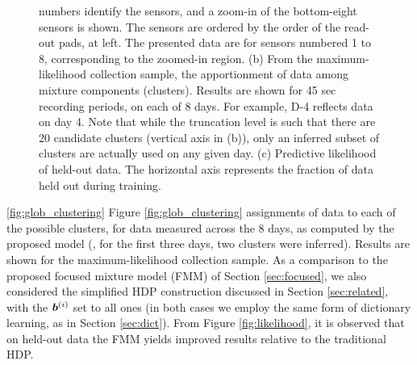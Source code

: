 \documentclass[journal]{IEEEtran}
\begin{document}
\begin{figure}[!htbp]
{{numbers identify the sensors, and a zoom-in of the bottom-eight
sensors is shown. The sensors are ordered by the order of the
read-out pads, at left. The presented data are for sensors numbered 1 to 8, corresponding to the zoomed-in region. (b) From the maximum-likelihood collection
sample, the apportionment of data among mixture components
(clusters). Results are shown for 45 sec recording periods, on each
of 8 days. For example, D-4 reflects data on day 4. Note that while the truncation level is such that there are 20 candidate clusters (vertical axis in (b)), only an inferred subset of clusters are actually used on any given day. (c) Predictive likelihood of held-out data. The
horizontal axis represents the fraction of data held out during training. 
}} \label{fig:long}
\end{figure}


\ref{fig:glob_clustering}  Figure \ref{fig:glob_clustering}  assignments of data to each of the possible clusters, for data measured across the 8 days, as computed by the proposed model (, for the first three days, two clusters were inferred). Results are shown for the maximum-likelihood collection sample. As a comparison to the proposed focused mixture model (FMM) of Section \ref{sec:focused}, we also considered the simplified HDP construction discussed in Section \ref{sec:related}, with the $\boldsymbol{b}^{(i)}$ set to all ones (in both cases we employ the same form of dictionary learning, as in Section \ref{sec:dict}). From Figure \ref{fig:likelihood}, it is observed that on held-out data the FMM yields improved results relative to the traditional HDP.
\end{document}
